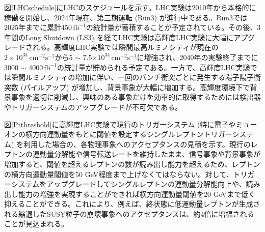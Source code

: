 図\ref{LHCschedule}にLHCのスケジュールを示す。LHC実験は2010年から本格的に稼働を開始し、2024年現在、第三期運転 (Run3) が進行中である。Run3では2025年までに累計450\,$\mathrm{fb}^{-1}$の統計量が蓄積することが予定されている。その後、3年間のLong Shutdown (LS3) を経てLHC実験は高輝度LHC実験に大幅にアプグレードされる。高輝度LHC実験では瞬間最高ルミノシティが現在の$2\times10^{34}\,\mathrm{cm}^{-2}\mathrm{s}^{-1}$から5  $\sim$ 7.5$\times10^{34}\,\mathrm{cm}^{-2}\mathrm{s}^{-1}$に増強され、2040年の実験終了までに3000  $\sim$ 4000\,$\mathrm{fb}^{-1}$の統計量が貯められる予定である。一方で、高輝度LHC実験では瞬間ルミノシティの増加に伴い、一回のバンチ衝突ごとに発生する陽子陽子衝突数 (パイルアップ) が増加し、背景事象が大幅に増加する。高輝度環境下で背景事象を適切に削減し、興味のある事象だけを効率的に取得するためには検出器やトリガーシステムのアップグレードが不可欠である。\par

図\ref{Ptthreshold}に高輝度LHC実験で現行のトリガーシステム (特に電子やミューオンの横方向運動量をもとに閾値を設定するシングルレプトントリガーシステム) を利用した場合の、各物理事象へのアクセプタンスの見積を示す。現行のレプトンの運動量分解能や信号転送レートを維持したまま、信号事象や背景事象が増加すると、閾値を超えるレプトンの数が読み出し能力を超えるため、レプトンの横方向運動量閾値を50 GeV程度まで上げなくてはならない。対して、トリガーシステムをアップグレードしてシングルレプトンの運動量分解能向上や、読み出し能力の増強を実現することができれば横方向運動量閾値を20 GeVまで低く抑えることができる。これにより、例えば、終状態に低運動量レプトンが生成される縮退したSUSY粒子の崩壊事象へのアクセプタンスは、約4倍に増幅されることが見込まれる。


